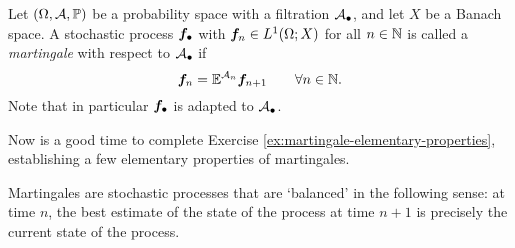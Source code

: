 \begin{defn}
  Let $(\Omega, \mathcal{A}, \mathbb{P})$ be a probability space with a filtration $\mathcal{A}_{\bullet}$, and let $X$ be a Banach space.
  A stochastic process $\bm{f}_{\bullet}$ with $\bm{f}_n \in L^1(\Omega; X)$ for all $n \in \mathbb{N}$ is called a \emph{martingale} with respect to $\mathcal{A}_{\bullet}$ if 
  \begin{equation}\label{eq:mgale-defining-property}
    \bm{f}_n = \mathbb{E}^{\mathcal{A}_n} \bm{f}_{n+1} \qquad \forall n \in \mathbb{N}.
  \end{equation}
  Note that in particular $\bm{f}_{\bullet}$ is adapted to $\mathcal{A}_{\bullet}$.
\end{defn}

\begin{rmk}
  Now is a good time to complete Exercise \ref{ex:martingale-elementary-properties}, establishing a few elementary properties of martingales. 
\end{rmk}

Martingales are stochastic processes that are `balanced' in the following sense: at time $n$, the best estimate of the state of the process at time $n+1$ is precisely the current state of the process.

